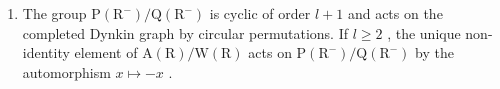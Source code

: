 \begin{enumerate}
\def\labelenumi{(\Roman{enumi})}
\setcounter{enumi}{11}
\tightlist
\item
  The group \(\mathrm{P}(\mathrm{R}^{-})/\mathrm{Q}(\mathrm{R}^{-})\) is cyclic of order \(l+1\) and acts on the completed Dynkin graph by circular permutations. If \(l\geqslant2\) , the unique non-identity element of \(\mathrm{A}(\mathrm{R})/\mathrm{W}(\mathrm{R})\) acts on \(\mathrm{P}(\mathrm{R}^{-})/\mathrm{Q}(\mathrm{R}^{-})\) by the automorphism \(x\mapsto-x\) .
\end{enumerate}


